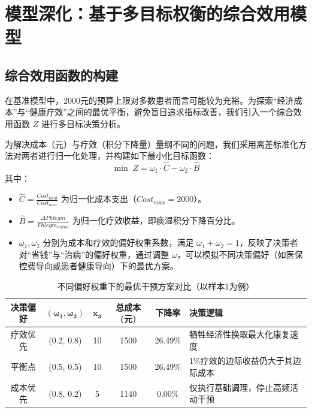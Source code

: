 \documentclass[12pt,a4paper]{article}
\begin{document}
\section{模型深化：基于多目标权衡的综合效用模型}

\subsection{综合效用函数的构建}
在基准模型中，2000元的预算上限对多数患者而言可能较为充裕。为探索“经济成本”与“健康疗效”之间的最优平衡，避免盲目追求指标改善，我们引入一个综合效用函数 $Z$ 进行多目标决策分析。

为解决成本（元）与疗效（积分下降量）量纲不同的问题，我们采用离差标准化方法对两者进行归一化处理，并构建如下最小化目标函数：
\begin{equation}
\min \; Z = \omega_1 \cdot \hat{C} - \omega_2 \cdot \hat{B}
\end{equation}
其中：
\begin{itemize}
    \item $\hat{C} = \frac{Cost_{total}}{Cost_{max}}$ 为归一化成本支出（$Cost_{max}=2000$）。
    \item $\hat{B} = \frac{\Delta Phlegm}{Phlegm_{initial}}$ 为归一化疗效收益，即痰湿积分下降百分比。
    \item $\omega_1, \omega_2$ 分别为成本和疗效的偏好权重系数，满足 $\omega_1 + \omega_2 = 1$，反映了决策者对“省钱”与“治病”的偏好权重，通过调整 $\omega$，可以模拟不同决策偏好（如医保控费导向或患者健康导向）下的最优方案。
\end{itemize}

\begin{table}[htbp]
\centering
\caption{不同偏好权重下的最优干预方案对比（以样本1为例）}
\label{tab:weight_preference}
\begin{tabular}{cccccl}
\toprule
\textbf{决策偏好} & $\boldsymbol{(\omega_1, \omega_2)}$ & $\boldsymbol{x_3}$ & \textbf{总成本(元)} & \textbf{下降率} & \textbf{决策逻辑} \\
\midrule
疗效优先 & (0.2, 0.8) & 10 & 1500 & 26.49\% & 牺牲经济性换取最大化康复速度 \\
平衡点   & (0.5, 0.5) & 10 & 1500 & 26.49\% & 1\%疗效的边际收益仍大于其边际成本 \\
成本优先 & (0.8, 0.2) & 5  & 1140 & 0.00\%  & 仅执行基础调理，停止高频活动干预 \\
\bottomrule
\end{tabular}
\end{table}
\end{document}
